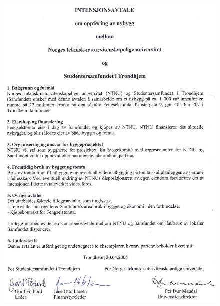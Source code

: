 \begin{figure}[p!tb]
\begin{center}
	\includegraphics[width=\textwidth]{AvtaleOmNybygg}
\end{center}
\end{figure}


